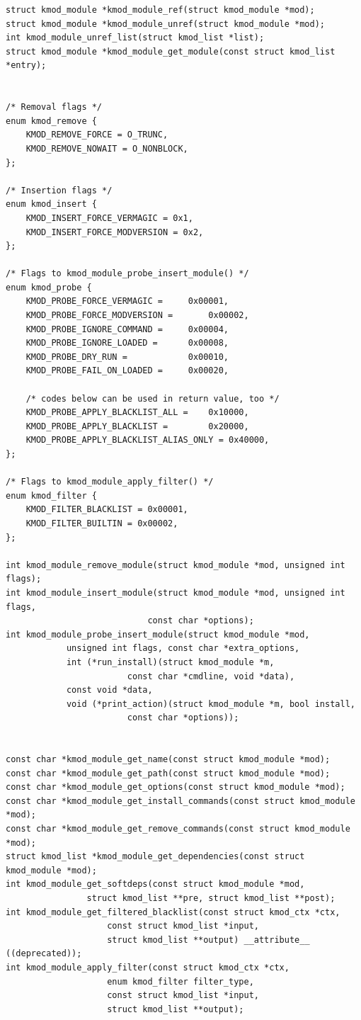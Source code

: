 {\begin{shaded}
\begin{verbatim}
struct kmod_module *kmod_module_ref(struct kmod_module *mod);
struct kmod_module *kmod_module_unref(struct kmod_module *mod);
int kmod_module_unref_list(struct kmod_list *list);
struct kmod_module *kmod_module_get_module(const struct kmod_list *entry);


/* Removal flags */
enum kmod_remove {
    KMOD_REMOVE_FORCE = O_TRUNC,
    KMOD_REMOVE_NOWAIT = O_NONBLOCK,
};

/* Insertion flags */
enum kmod_insert {
    KMOD_INSERT_FORCE_VERMAGIC = 0x1,
    KMOD_INSERT_FORCE_MODVERSION = 0x2,
};

/* Flags to kmod_module_probe_insert_module() */
enum kmod_probe {
    KMOD_PROBE_FORCE_VERMAGIC =     0x00001,
    KMOD_PROBE_FORCE_MODVERSION =       0x00002,
    KMOD_PROBE_IGNORE_COMMAND =     0x00004,
    KMOD_PROBE_IGNORE_LOADED =      0x00008,
    KMOD_PROBE_DRY_RUN =            0x00010,
    KMOD_PROBE_FAIL_ON_LOADED =     0x00020,

    /* codes below can be used in return value, too */
    KMOD_PROBE_APPLY_BLACKLIST_ALL =    0x10000,
    KMOD_PROBE_APPLY_BLACKLIST =        0x20000,
    KMOD_PROBE_APPLY_BLACKLIST_ALIAS_ONLY = 0x40000,
};

/* Flags to kmod_module_apply_filter() */
enum kmod_filter {
    KMOD_FILTER_BLACKLIST = 0x00001,
    KMOD_FILTER_BUILTIN = 0x00002,
};

int kmod_module_remove_module(struct kmod_module *mod, unsigned int flags);
int kmod_module_insert_module(struct kmod_module *mod, unsigned int flags,
                            const char *options);
int kmod_module_probe_insert_module(struct kmod_module *mod,
            unsigned int flags, const char *extra_options,
            int (*run_install)(struct kmod_module *m,
                        const char *cmdline, void *data),
            const void *data,
            void (*print_action)(struct kmod_module *m, bool install,
                        const char *options));


const char *kmod_module_get_name(const struct kmod_module *mod);
const char *kmod_module_get_path(const struct kmod_module *mod);
const char *kmod_module_get_options(const struct kmod_module *mod);
const char *kmod_module_get_install_commands(const struct kmod_module *mod);
const char *kmod_module_get_remove_commands(const struct kmod_module *mod);
struct kmod_list *kmod_module_get_dependencies(const struct kmod_module *mod);
int kmod_module_get_softdeps(const struct kmod_module *mod,
                struct kmod_list **pre, struct kmod_list **post);
int kmod_module_get_filtered_blacklist(const struct kmod_ctx *ctx,
                    const struct kmod_list *input,
                    struct kmod_list **output) __attribute__ ((deprecated));
int kmod_module_apply_filter(const struct kmod_ctx *ctx,
                    enum kmod_filter filter_type,
                    const struct kmod_list *input,
                    struct kmod_list **output);




\end{verbatim}
\end{shaded}}
